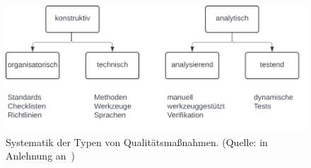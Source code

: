 \begin{figure}
    \centering
    \includegraphics[scale=0.4]{part four/Typen von Qualitätsmaßnahmen/img/systematik qualitätsmaßnahmen}
    \caption{Systematik der Typen von Qualitätsmaßnahmen. (Quelle: in Anlehnung an~\cite[Abb. 2.1, 8]{Wed09c})}
    \label{fig:systematik qualitätsmaßnahmen-cc}
\end{figure}